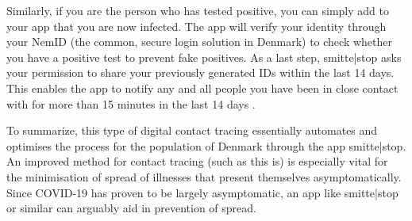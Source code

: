 Similarly, if you are the person who has tested positive, you can simply add to your app that you are now infected. The app will verify your identity through your NemID (the common, secure login solution in Denmark) to check whether you have a positive test to prevent fake positives. As a last step, smitte|stop asks your permission to share your previously generated IDs within the last 14 days. This enables the app to notify any and all people you have been in close contact with for more than 15 minutes in the last 14 days \citep{smittestopdk_download_nodate}.

To summarize, this type of digital contact tracing essentially automates and optimises the process for the population of Denmark through the app smitte|stop. An improved method for contact tracing (such as this is) is especially vital for the minimisation of spread of illnesses that present themselves asymptomatically. Since COVID-19 has proven to be largely asymptomatic, an app like smitte|stop or similar can arguably aid in prevention of spread.